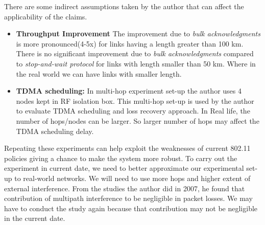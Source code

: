 \documentclass{article}
\begin{document}
\par There are some indirect assumptions taken by the author that can affect the applicability of the claims.
\begin{itemize}
    \item \textbf{Throughput Improvement} The improvement due to \textit{bulk acknowledgments} is more pronounced(4-5x) for links having a length greater than 100 km. There is no significant improvement due to \textit{bulk acknowledgments} compared to \textit{stop-and-wait protocol} for links with length smaller than 50 km. Where in the real world we can have links with smaller length.
    \item \textbf{TDMA scheduling:} In multi-hop experiment set-up the author uses 4 nodes kept in RF isolation box. This multi-hop set-up is used by the author to evaluate TDMA scheduling and loss recovery approach. In Real life, the number of hops/nodes can be larger. So larger number of hops may affect the TDMA scheduling delay.
\end{itemize}{}
\par Repeating these experiments can help exploit the weaknesses of current 802.11 policies giving a chance to make the system more robust. To carry out the experiment in current date, we need to better approximate our experimental set-up to real-world networks. We will need to use more hops and higher extent of external interference. From the studies the author did in 2007, he found that contribution of multipath interference to be negligible in packet losses. We may have to conduct the study again because that contribution may not be negligible in the current date.
\end{document}
